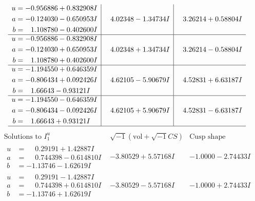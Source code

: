 \documentclass[1p]{elsarticle_modified}
\theoremstyle{definition}
\newcommand{\I}{\sqrt{-1}}
\begin{document}
$$\begin{array}{c|c|c}
\begin{aligned}
u &= -0.956886 + 0.832908 I \\
a &= -0.124030 - 0.650953 I \\
b &= \phantom{-}1.108780 - 0.402600 I\end{aligned}
 & \phantom{-}4.02348 - 1.34734 I & \phantom{-}3.26214 + 0.58804 I \\ \hline\begin{aligned}
u &= -0.956886 - 0.832908 I \\
a &= -0.124030 + 0.650953 I \\
b &= \phantom{-}1.108780 + 0.402600 I\end{aligned}
 & \phantom{-}4.02348 + 1.34734 I & \phantom{-}3.26214 - 0.58804 I \\ \hline\begin{aligned}
u &= -1.194550 + 0.646359 I \\
a &= -0.806434 + 0.092426 I \\
b &= \phantom{-}1.66643 - 0.93121 I\end{aligned}
 & \phantom{-}4.62105 - 5.90679 I & \phantom{-}4.52831 + 6.63187 I \\ \hline\begin{aligned}
u &= -1.194550 - 0.646359 I \\
a &= -0.806434 - 0.092426 I \\
b &= \phantom{-}1.66643 + 0.93121 I\end{aligned}
 & \phantom{-}4.62105 + 5.90679 I & \phantom{-}4.52831 - 6.63187 I\\
 \hline 
 \end{array}$$\newpage$$\begin{array}{c|c|c}  
\text{Solutions to }I^u_{1}& \I (\text{vol} + \sqrt{-1}CS) & \text{Cusp shape}\\
 \hline 
\begin{aligned}
u &= \phantom{-}0.29191 + 1.42887 I \\
a &= \phantom{-}0.744398 - 0.614810 I \\
b &= -1.13746 - 1.62619 I\end{aligned}
 & -3.80529 + 5.57168 I & -1.0000 - 2.74433 I \\ \hline\begin{aligned}
u &= \phantom{-}0.29191 - 1.42887 I \\
a &= \phantom{-}0.744398 + 0.614810 I \\
b &= -1.13746 + 1.62619 I\end{aligned}
 & -3.80529 - 5.57168 I & -1.0000 + 2.74433 I \\ \hline\begin{aligned}

\end{aligned}
\end{array}$$
\end{document}
